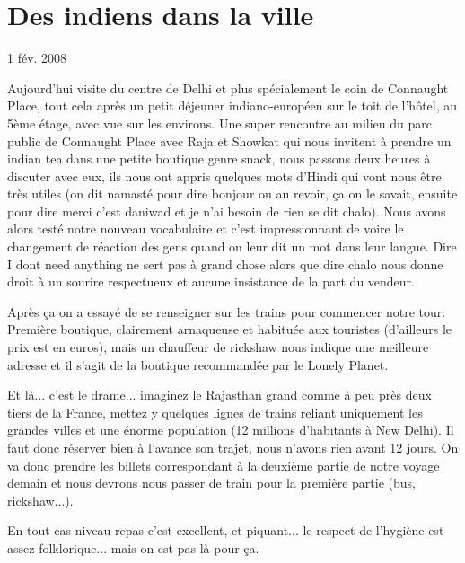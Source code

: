 \section{Des indiens dans la ville}

1 fév. 2008

\begin{multicols}{2}


Aujourd'hui visite du centre de Delhi et plus spécialement le coin de Connaught Place, tout cela après un petit déjeuner indiano-européen sur le toit de l’hôtel, au 5ème étage, avec vue sur les environs. Une super rencontre au milieu du parc public de Connaught Place avec Raja et Showkat qui nous invitent à prendre un indian tea dans une petite boutique genre snack, nous passons deux heures à discuter avec eux, ils nous ont appris quelques mots d’Hindi qui vont nous être très utiles (on dit namasté pour dire bonjour ou au revoir, ça on le savait, ensuite pour dire merci c’est daniwad et je n’ai besoin de rien se dit chalo). Nous avons alors testé notre nouveau vocabulaire et c’est impressionnant de voire le changement de réaction des gens quand on leur dit un mot dans leur langue. Dire I dont need anything ne sert pas à grand chose alors que dire chalo nous donne droit à un sourire respectueux et aucune insistance de la part du vendeur.

%

Après ça on a essayé de se renseigner sur les trains pour commencer notre tour.
Première boutique, clairement arnaqueuse et habituée aux touristes (d’ailleurs le prix est en euros), mais un chauffeur de rickshaw nous indique une meilleure adresse et il s’agit de la boutique recommandée par le Lonely Planet.

%
Et là... c’est le drame... imaginez le Rajasthan grand comme à peu près deux tiers de la France, mettez y quelques lignes de trains reliant uniquement les grandes villes et une énorme population (12 millions d'habitants à New Delhi). Il faut donc réserver bien à l’avance son trajet, nous n’avons rien avant 12 jours.
On va donc prendre les billets correspondant à la deuxième partie de notre voyage demain et nous devrons nous passer de train pour la première partie (bus, rickshaw...).

%

En tout cas niveau repas c’est excellent, et piquant... le respect de l’hygiène est assez folklorique... mais on est pas là pour ça.


\end{multicols}

\pagebreak
